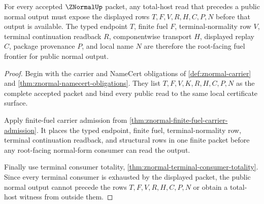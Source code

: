 \begin{theorem}
\label{thm:znormal-root-total-host-fuel-frontier}
For every accepted $\ZNormalUp$ packet, any total-host read that precedes a public normal output must expose the displayed rows $T,F,V,R,H,C,P,N$ before that output is available. The typed endpoint $T$, finite fuel $F$, terminal-normality row $V$, terminal continuation readback $R$, componentwise transport $H$, displayed replay $C$, package provenance $P$, and local name $N$ are therefore the root-facing fuel frontier for public normal output.
\end{theorem}
\begin{proof}
Begin with the carrier and NameCert obligations of \autoref{def:znormal-carrier} and \autoref{thm:znormal-namecert-obligations}. They list $T,F,V,K,R,H,C,P,N$ as the complete accepted packet and bind every public read to the same local certificate surface.

Apply finite-fuel carrier admission from \autoref{thm:znormal-finite-fuel-carrier-admission}. It places the typed endpoint, finite fuel, terminal-normality row, terminal continuation readback, and structural rows in one finite packet before any root-facing normal-form consumer can read the output.

Finally use terminal consumer totality, \autoref{thm:znormal-terminal-consumer-totality}. Since every terminal consumer is exhausted by the displayed packet, the public normal output cannot precede the rows $T,F,V,R,H,C,P,N$ or obtain a total-host witness from outside them.
\end{proof}


